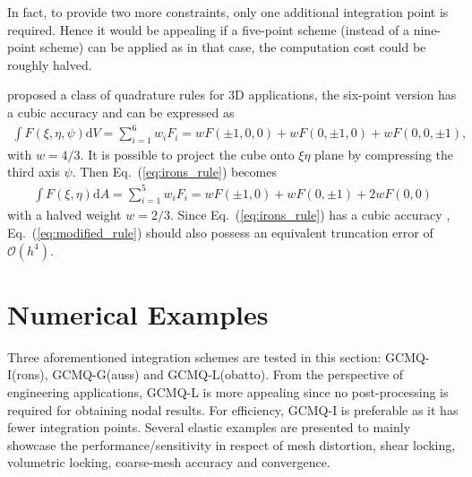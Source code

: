 \documentclass[3p,sort&compress,review,11pt]{elsarticle}
\newcommand*{\md}[1]{\mathrm{d}#1}
\newcommand*{\eqsref}[1]{Eq.~(\ref{#1})}
\begin{document}
In fact, to provide two more constraints, only one additional integration point is required. Hence it would be appealing if a five-point scheme (instead of a nine-point scheme) can be applied as in that case, the computation cost could be roughly halved.

\citet{Irons1971} proposed a class of quadrature rules for 3D applications, the six-point version has a cubic accuracy and can be expressed as
\begin{gather}\label{eq:irons_rule}
\int{}F\left(\xi,\eta,\psi\right)\md{V}=\sum_{i=1}^{6}w_iF_i=wF\left(\pm1,0,0\right)+wF\left(0,\pm1,0\right)+wF\left(0,0,\pm1\right),
\end{gather}
with $w=4/3$. It is possible to project the cube onto $\xi\eta$ plane by compressing the third axis $\psi$. Then \eqsref{eq:irons_rule} becomes
\begin{gather}\label{eq:modified_rule}
\int{}F\left(\xi,\eta\right)\md{A}=\sum_{i=1}^{5}w_iF_i=wF\left(\pm1,0\right)+wF\left(0,\pm1\right)+2wF\left(0,0\right)
\end{gather}
with a halved weight $w=2/3$. Since \eqsref{eq:irons_rule} has a cubic accuracy \citep{Irons1971}, \eqsref{eq:modified_rule} should also possess an equivalent truncation error of $\mathcal{O}(h^4)$.
\section{Numerical Examples}
Three aforementioned integration schemes are tested in this section: GCMQ-I(rons), GCMQ-G(auss) and GCMQ-L(obatto). From the perspective of engineering applications, GCMQ-L is more appealing since no post-processing is required for obtaining nodal results. For efficiency, GCMQ-I is preferable as it has fewer integration points. Several elastic examples are presented to mainly showcase the performance/sensitivity in respect of mesh distortion, shear locking, volumetric locking, coarse-mesh accuracy and convergence.
\end{document}
